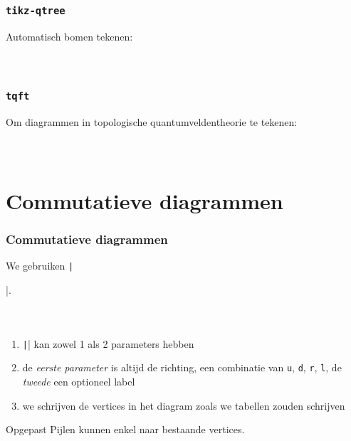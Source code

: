 \documentclass[]{beamer}
\begin{document}
\begin{frame}
  \frametitle{\texttt{tikz-qtree}}
  
  Automatisch bomen tekenen:
  \begin{columns}
    \begin{column}{.6\textwidth}
      \inputminted[fontsize = \scriptsize]{latex}{tikz/tikz-qtree.tikz}
    \end{column}
    \begin{column}{.4\textwidth}
      
    \end{column}
  \end{columns}
\end{frame}

\begin{frame}
  \frametitle{\texttt{tqft}}
  
  Om diagrammen in topologische quantumveldentheorie te tekenen:
  \begin{columns}
    \begin{column}{.6\textwidth}
      \inputminted[fontsize = \scriptsize]{latex}{tikz/tqft.tikz}
    \end{column}
    \begin{column}{.4\textwidth}
      
    \end{column}
  \end{columns}
\end{frame}

\section{Commutatieve diagrammen}

\begin{frame}[fragile]
  \frametitle{Commutatieve diagrammen}

  We gebruiken \texttt|\usepackage{tikz-cd}|.

  \begin{columns}
    \begin{column}{.67\textwidth}
      \inputminted[fontsize = \scriptsize]{latex}{tikz/diagrams/1.tikz}
    \end{column}
    \begin{column}{.33\textwidth}
      
    \end{column}
  \end{columns}
  \begin{enumerate}
    \item\pause \texttt|\arrow| kan zowel 1 als 2 parameters hebben
    \item\pause de \emph{eerste parameter} is altijd de richting, een combinatie van \texttt{u}, \texttt{d}, \texttt{r}, \texttt{l}, de \emph{tweede} een optioneel label
    \item\pause we schrijven de vertices in het diagram zoals we tabellen zouden schrijven
  \end{enumerate}
  \begin{alertblock}{Opgepast}
    \dbend Pijlen kunnen enkel naar bestaande vertices.
  \end{alertblock}
\end{frame}
\end{document}
